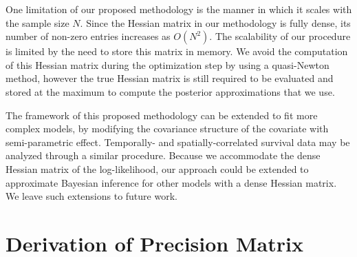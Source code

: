 \documentclass[AMA,STIX1COL,doublespace]{WileyNJD-v2}
\begin{document}
One limitation of our proposed methodology is the manner in which it scales with the sample size $N$. Since the Hessian matrix in our methodology is fully dense, its number of non-zero entries increases as $O(N^{2})$. The scalability of our procedure is limited by the need to store this matrix in memory. We avoid the computation of this Hessian matrix during the optimization step by using a quasi-Newton method, however the true Hessian matrix is still required to be evaluated and stored at the maximum to compute the posterior approximations that we use.

The framework of this proposed methodology can be extended to fit more complex models, by modifying the covariance structure of the covariate with semi-parametric effect. Temporally- and spatially-correlated survival data may be analyzed through a similar procedure. Because we accommodate the dense Hessian matrix of the log-likelihood, our approach could be extended to approximate Bayesian inference for other models with a dense Hessian matrix. We leave such extensions to future work.



\appendix

\section{Derivation of Precision Matrix}
\end{document}
